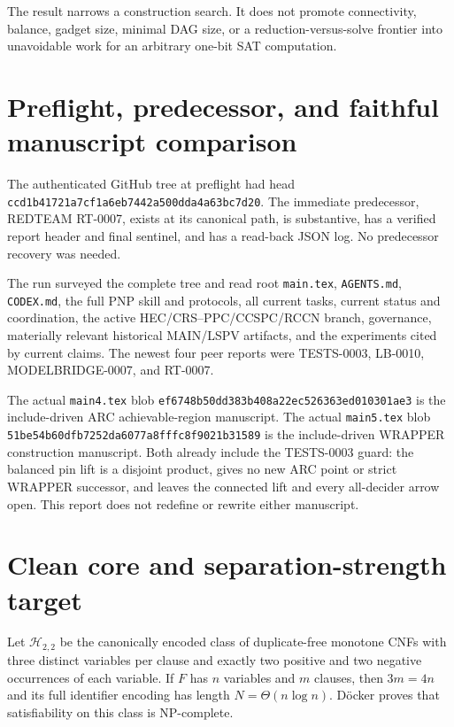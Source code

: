 \documentclass[11pt]{article}
\begin{document}
The result narrows a construction search.  It does not promote connectivity,
balance, gadget size, minimal DAG size, or a reduction-versus-solve frontier
into unavoidable work for an arbitrary one-bit SAT computation.

\section{Preflight, predecessor, and faithful manuscript comparison}

The authenticated GitHub tree at preflight had head
\texttt{ccd1b41721a7cf1a6eb7442a500dda4a63bc7d20}.  The immediate
predecessor, REDTEAM RT-0007, exists at its canonical path, is substantive,
has a verified report header and final sentinel, and has a read-back JSON log.
No predecessor recovery was needed.

The run surveyed the complete tree and read root \texttt{main.tex},
\texttt{AGENTS.md}, \texttt{CODEX.md}, the full PNP skill and protocols, all
current tasks, current status and coordination, the active
HEC/CRS--PPC/CCSPC/RCCN branch, governance, materially relevant historical
MAIN/LSPV artifacts, and the experiments cited by current claims.  The newest
four peer reports were TESTS-0003, LB-0010, MODELBRIDGE-0007, and RT-0007.

The actual \texttt{main4.tex} blob
\texttt{ef6748b50dd383b408a22ec526363ed010301ae3} is the include-driven ARC
achievable-region manuscript.  The actual \texttt{main5.tex} blob
\texttt{51be54b60dfb7252da6077a8fffc8f9021b31589} is the include-driven
WRAPPER construction manuscript.  Both already include the TESTS-0003 guard:
the balanced pin lift is a disjoint product, gives no new ARC point or strict
WRAPPER successor, and leaves the connected lift and every all-decider arrow
open.  This report does not redefine or rewrite either manuscript.

\section{Clean core and separation-strength target}

Let $\mathcal H_{2,2}$ be the canonically encoded class of duplicate-free
monotone CNFs with three distinct variables per clause and exactly two
positive and two negative occurrences of each variable.  If $F$ has $n$
variables and $m$ clauses, then $3m=4n$ and its full identifier encoding has
length $N=\Theta(n\log n)$.  D\"ocker proves that satisfiability on this
class is NP-complete.
\end{document}
